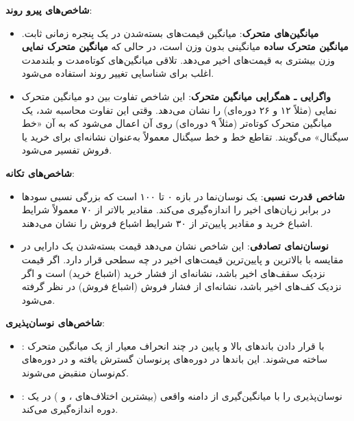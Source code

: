 \documentclass[12pt, a4paper]{report}
\begin{document}
\bigskip
\textbf{شاخص‌های پیرو روند}:
\begin{itemize}
    \item \textbf{میانگین‌های متحرک}: میانگین قیمت‌های بسته‌شدن در یک پنجره زمانی ثابت. \textbf{میانگین متحرک ساده} میانگینی بدون وزن است، در حالی که \textbf{میانگین متحرک نمایی} وزن بیشتری به قیمت‌های اخیر می‌دهد. تلاقی میانگین‌های کوتاه‌مدت و بلندمدت اغلب برای شناسایی تغییر روند استفاده می‌شود.  
\item \textbf{واگرایی ـ همگرایی میانگین متحرک}: 
این شاخص تفاوت بین دو میانگین متحرک نمایی (مثلاً ۱۲ و ۲۶ دوره‌ای) را نشان می‌دهد. 
وقتی این تفاوت محاسبه شد، یک میانگین متحرک کوتاه‌تر (مثلاً ۹ دوره‌ای) روی آن اعمال می‌شود که به آن «خط سیگنال» می‌گویند. 
تقاطع خط  و خط سیگنال معمولاً به‌عنوان نشانه‌ای برای خرید یا فروش تفسیر می‌شود.

\end{itemize}

\bigskip
\textbf{شاخص‌های تکانه}:
\begin{itemize}
    \item \textbf{شاخص قدرت نسبی}: یک نوسان‌نما در بازه ۰ تا ۱۰۰ است که بزرگی نسبی سودها در برابر زیان‌های اخیر را اندازه‌گیری می‌کند. مقادیر بالاتر از ۷۰ معمولاً شرایط اشباع خرید و مقادیر پایین‌تر از ۳۰ شرایط اشباع فروش را نشان می‌دهند.  
\item \textbf{نوسان‌نمای تصادفی}: 
این شاخص نشان می‌دهد قیمت بسته‌شدن یک دارایی در مقایسه با بالاترین و پایین‌ترین قیمت‌های اخیر در چه سطحی قرار دارد. 
اگر قیمت نزدیک سقف‌های اخیر باشد، نشانه‌ای از فشار خرید (اشباع خرید) است و اگر نزدیک کف‌های اخیر باشد، نشانه‌ای از فشار فروش (اشباع فروش) در نظر گرفته می‌شود.
\end{itemize}

\bigskip
\textbf{شاخص‌های نوسان‌پذیری}:
\begin{itemize}
\item {}: با قرار دادن باندهای بالا و پایین در چند انحراف معیار از یک میانگین متحرک ساخته می‌شوند. این باندها در دوره‌های پرنوسان گسترش یافته و در دوره‌های کم‌نوسان منقبض می‌شوند.  

\item {}: نوسان‌پذیری را با میانگین‌گیری از دامنه واقعی (بیشترین اختلاف‌های ،  و ) در یک دوره اندازه‌گیری می‌کند.
\end{itemize}
\end{document}
